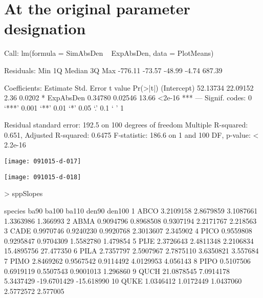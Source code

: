\documentclass{article}
\begin{document}
\section{At the original parameter designation}
\begin{Schunk}
\begin{Soutput}
Call:
lm(formula = SimAbsDen ~ ExpAbsDen, data = PlotMeans)

Residuals:
    Min      1Q  Median      3Q     Max 
-776.11  -73.57  -48.99   -4.74  687.39 

Coefficients:
            Estimate Std. Error t value Pr(>|t|)    
(Intercept) 52.13734   22.09152    2.36   0.0202 *  
ExpAbsDen    0.34780    0.02546   13.66   <2e-16 ***
---
Signif. codes:  0 ‘***’ 0.001 ‘**’ 0.01 ‘*’ 0.05 ‘.’ 0.1 ‘ ’ 1

Residual standard error: 192.5 on 100 degrees of freedom
Multiple R-squared:  0.651,	Adjusted R-squared:  0.6475 
F-statistic: 186.6 on 1 and 100 DF,  p-value: < 2.2e-16
\end{Soutput}
\end{Schunk}
\texttt{[image: 091015-d-017]}

\texttt{[image: 091015-d-018]}
\begin{Schunk}
\begin{Sinput}
>   sppSlopes
\end{Sinput}
\begin{Soutput}
   species       ba90     ba100     ba110       den90     den100
1     ABCO  3.2109158 2.8679859 3.1087661   1.3363986   1.366993
2     ABMA  0.9094796 0.8968508 0.9307194   2.2171767   2.218563
3     CADE  0.9970746 0.9240230 0.9920768   2.3013607   2.345902
4     PICO  0.9559808 0.9295847 0.9704309   1.5582780   1.479854
5     PIJE  2.3726643 2.4811348 2.2106834  15.4895756  27.477350
6     PILA  2.7357797 2.5907967 2.7875110   3.6350821   3.557684
7     PIMO  2.8469262 0.9567542 0.9114492   4.0129953   4.056143
8     PIPO  0.5107506 0.6919119 0.5507543   0.9001013   1.296860
9     QUCH 21.0878545 7.0914178 5.3437429 -19.6701429 -15.618990
10    QUKE  1.0346412 1.0172449 1.0437060   2.5772572   2.577005
\end{Soutput}
\end{Schunk}





\newpage
\end{document}
